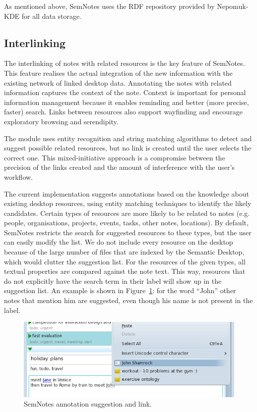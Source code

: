 As mentioned above, SemNotes uses the RDF repository provided by Nepomuk-KDE for all data storage. 

\subsection{Interlinking}
\label{sub:interlinking}
The interlinking of notes with related resources is the key feature of SemNotes. This feature realises the actual integration of the new information with the existing network of linked desktop data. Annotating the notes with related information captures the context of the note. Context is important for personal information management because it enables reminding and better (more precise, faster) search. Links between resources also support wayfinding \cite{Jones2008KFTFBook} and encourage exploratory browsing and serendipity.

The module uses entity recognition and string matching algorithms to detect and suggest possible related resources, but no link is created until the user selects the correct one. This mixed-initiative approach is a compromise between the precision of the links created and the amount of interference with the user's workflow.

The current implementation suggests annotations based on the knowledge about existing desktop resources, using entity matching techniques to identify the likely candidates. Certain types of resources are more likely to be related to notes (e.g. people, organisations, projects, events, tasks, other notes, locations). By default, SemNotes restricts the search for suggested resources to these types, but the user can easily modify the list. We do not include every resource on the desktop because of the large number of files that are indexed by the Semantic Desktop, which would clutter the suggestion list. For the resources of the given types, all textual properties are compared against the note text. This way, resources that do not explicitly have the search term in their label will show up in the suggestion list. An example is shown in Figure~\ref{fig:annotation}: for the word ``John'' other notes that mention him are suggested, even though his name is not present in the label.

\begin{figure}[tb]
 \includegraphics[width=\linewidth]{chapters/core/img/semnotes-screenshot-menu}
\caption{SemNotes annotation suggestion and link.}
\label{fig:annotation}
\end{figure} 

